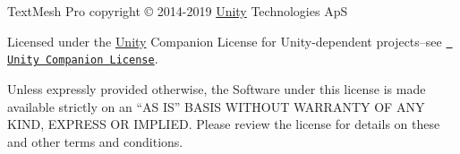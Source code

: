 Text\+Mesh Pro copyright © 2014-\/2019 \mbox{\hyperlink{namespace_unity}{Unity}} Technologies ApS

Licensed under the \mbox{\hyperlink{namespace_unity}{Unity}} Companion License for Unity-\/dependent projects--see \href{http://www.unity3d.com/legal/licenses/Unity_Companion_License}{\texttt{ Unity Companion License}}.

Unless expressly provided otherwise, the Software under this license is made available strictly on an “\+AS I\+S” B\+A\+S\+IS W\+I\+T\+H\+O\+UT W\+A\+R\+R\+A\+N\+TY OF A\+NY K\+I\+ND, E\+X\+P\+R\+E\+SS OR I\+M\+P\+L\+I\+ED. Please review the license for details on these and other terms and conditions. 